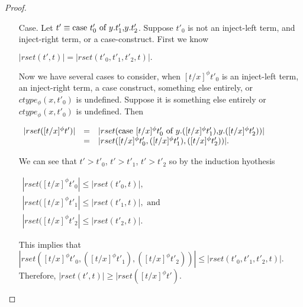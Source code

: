 \begin{proof}
\begin{itemize}
\item[Case.] 
  Let $t' \equiv \mbox{case}\ t'_0\ \text{of}\ y\text{.}t'_1\text{,}y\text{.}t'_2$.  Suppose $t'_0$ is not an inject-left term, and inject-right term,
  or a case-construct.  First we know 
  \begin{center}
    \begin{math}
      |rset(t', t)| = |rset(t'_0, t'_1, t'_2, t)|.
    \end{math}
  \end{center}
  Now we have several cases to consider, when $[t/x]^\phi t'_0$ is an inject-left term,
  an inject-right term, a case construct, something else entirely, or $ctype_\phi(x,t'_0)$ is undefined. Suppose it is something else entirely or
  $ctype_\phi(x,t'_0)$ is undefined.
  Then 
  \begin{center}
    \begin{math}
      \begin{array}{lll}
        |rset([t/x]^\phi t')| & = & |rset(\mbox{case}\ [t/x]^\phi t'_0\ \text{of}\ y\text{.}([t/x]^\phi t'_1)\text{,}y\text{.}([t/x]^\phi t'_2))|\\
        & = & |rset([t/x]^\phi t'_0,([t/x]^\phi t'_1),([t/x]^\phi t'_2))|.
      \end{array}
    \end{math}
  \end{center}
  We can see that $t' > t'_0$, $t' > t'_1$, $t' > t'_2$ so by the induction hyothesis
  \begin{center}
    \begin{math}
      \begin{array}{lll}
        |rset([t/x]^\phi t'_0| \leq |rset(t'_0, t)|,\\
        |rset([t/x]^\phi t'_1| \leq |rset(t'_1, t)|, \text{ and }\\
        |rset([t/x]^\phi t'_2| \leq |rset(t'_2, t)|.
      \end{array}
    \end{math}
  \end{center}
  This implies that $|rset([t/x]^\phi t'_0,([t/x]^\phi t'_1),([t/x]^\phi t'_2))| \leq |rset(t'_0,t'_1,t'_2,t)|$.\\
  Therefore, $|rset(t', t)| \geq |rset([t/x]^\phi t')$.
  

\end{itemize}
\end{proof}
